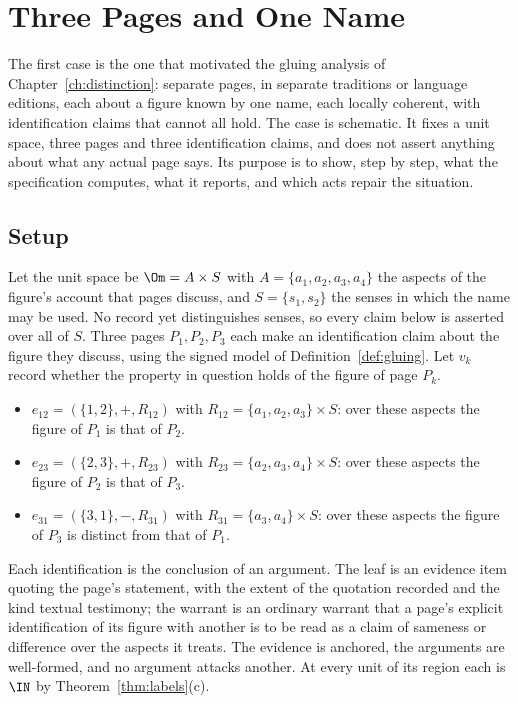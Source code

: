 \chapter{Three Pages and One Name}\label{ch:adam}

The first case is the one that motivated the gluing analysis of Chapter~\ref{ch:distinction}: separate pages, in separate traditions or language editions, each about a figure known by one name, each locally coherent, with identification claims that cannot all hold. The case is schematic. It fixes a unit space, three pages and three identification claims, and does not assert anything about what any actual page says. Its purpose is to show, step by step, what the specification computes, what it reports, and which acts repair the situation.

\section{Setup}\label{sec:case1setup}

Let the unit space be $\Om=A\times S$ with $A=\{a_1,a_2,a_3,a_4\}$ the aspects of the figure's account that pages discuss, and $S=\{s_1,s_2\}$ the senses in which the name may be used. No record yet distinguishes senses, so every claim below is asserted over all of $S$. Three pages $P_1,P_2,P_3$ each make an identification claim about the figure they discuss, using the signed model of Definition~\ref{def:gluing}. Let $v_k$ record whether the property in question holds of the figure of page $P_k$.
\begin{itemize}
\item $e_{12}=(\{1,2\},+,R_{12})$ with $R_{12}=\{a_1,a_2,a_3\}\times S$: over these aspects the figure of $P_1$ is that of $P_2$.
\item $e_{23}=(\{2,3\},+,R_{23})$ with $R_{23}=\{a_2,a_3,a_4\}\times S$: over these aspects the figure of $P_2$ is that of $P_3$.
\item $e_{31}=(\{3,1\},-,R_{31})$ with $R_{31}=\{a_3,a_4\}\times S$: over these aspects the figure of $P_3$ is distinct from that of $P_1$.
\end{itemize}
Each identification is the conclusion of an argument. The leaf is an evidence item quoting the page's statement, with the extent of the quotation recorded and the kind \textsf{textual testimony}; the warrant is an ordinary warrant that a page's explicit identification of its figure with another is to be read as a claim of sameness or difference over the aspects it treats. The evidence is anchored, the arguments are well-formed, and no argument attacks another. At every unit of its region each is $\IN$ by Theorem~\ref{thm:labels}(c).

